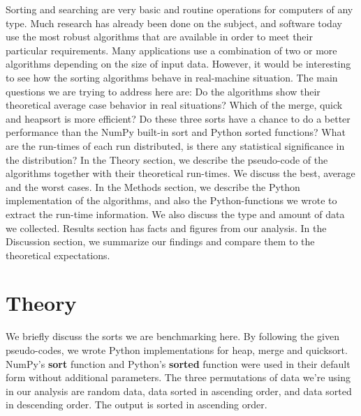 \documentclass[sigconf, nonacm, natbib, screen, balance=False]{acmart}
\begin{document}
Sorting and searching are very basic and routine operations for computers of any type. Much research has already been done on the subject, and software today use the most robust algorithms that are available in order to meet their particular requirements. Many applications use a combination of two or more algorithms depending on the size of input data. However, it would be interesting to see how the sorting algorithms behave in real-machine situation.\newline
\label{questions}The main questions we are trying to address here are: Do the algorithms show their theoretical average case behavior in real situations? Which of the merge, quick and heapsort is more efficient? Do these three sorts have a chance to do a better performance than the NumPy built-in sort and Python sorted functions? What are the run-times of each run distributed, is there any statistical significance in the distribution? \newline
In the Theory section, we describe the pseudo-code of the algorithms together with their theoretical run-times. We discuss the best, average and the worst cases.  In the Methods section, we describe the Python implementation of the algorithms, and also the Python-functions we wrote to extract the run-time information. We also discuss the type and amount of data we collected. Results section has facts and figures from our analysis. In the Discussion section, we summarize our findings and compare them to the theoretical expectations.

\section{Theory}\label{sec:theory}
We briefly discuss the sorts we are benchmarking here. By following the given pseudo-codes, we wrote Python implementations for heap, merge and quicksort. NumPy's \textbf{sort} function and Python's \textbf{sorted} function were used in their default form without additional parameters. The three permutations of data we're using in our analysis are random data, data sorted in ascending order, and data sorted in descending order. The output is sorted in ascending order.
\end{document}
